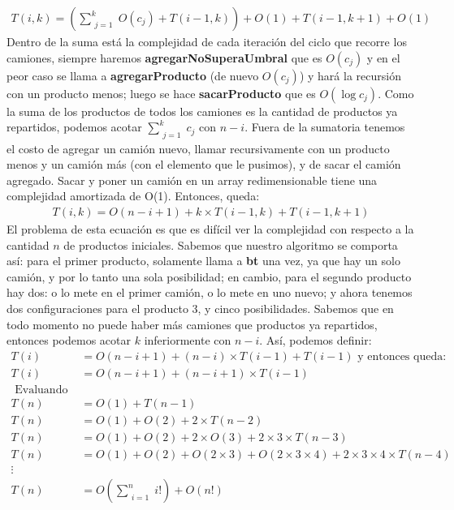 \begin{align*}
T(i,k) = \left(\sum\limits_{\substack{j = 1}}^k O(c_j) + T(i-1,k)\right) + O(1) + T(i-1,k+1) + O(1)
\end{align*}
Dentro de la suma está la complejidad de cada iteración del ciclo que recorre los camiones, siempre haremos \textbf{agregarNoSuperaUmbral} que es $O(c_j)$ y en el peor caso se llama a \textbf{agregarProducto} (de nuevo $O(c_j)$) y hará la recursión con un producto menos; luego se hace \textbf{sacarProducto} que es $O(\log c_j)$. Como la suma de los productos de todos los camiones es la cantidad de productos ya repartidos, podemos acotar $\sum\limits_{\substack{j = 1}}^k c_j$ con $n-i$. Fuera de la sumatoria tenemos el costo de agregar un camión nuevo, llamar recursivamente con un producto menos y un camión más (con el elemento que le pusimos), y de sacar el camión agregado. Sacar y poner un camión en un array redimensionable tiene una complejidad amortizada de O(1). Entonces, queda:
\begin{align*}
T(i,k) = O(n-i+1) + k \times T(i-1,k) + T(i-1,k+1)
\end{align*}
El problema de esta ecuación es que es difícil ver la complejidad con respecto a la cantidad $n$ de productos iniciales. Sabemos que nuestro algoritmo se comporta así: para el primer producto, solamente llama a \textbf{bt} una vez, ya que hay un solo camión, y por lo tanto una sola posibilidad; en cambio, para el segundo producto hay dos: o lo mete en el primer camión, o lo mete en uno nuevo; y ahora tenemos dos configuraciones para el producto 3, y cinco posibilidades. Sabemos que en todo momento no puede haber más camiones que productos ya repartidos, entonces podemos acotar $k$ inferiormente con $n-i$. Así, podemos definir:
\begin{align*}
T(i) &= O(n-i+1) + (n-i) \times T(i-1) + T(i-1) \text{ y entonces queda: } \\
T(i) &= O(n-i+1) + (n-i+1) \times T(i-1) \\
\text{ Evaluando en n: } \\
T(n) &= O(1) + T(n-1) \\
T(n) &= O(1) + O(2) + 2 \times T(n-2) \\
T(n) &= O(1) + O(2) + 2 \times O(3) + 2 \times 3 \times T(n-3) \\
T(n) &= O(1) + O(2) + O(2 \times 3) + O(2 \times 3 \times 4) + 2 \times 3 \times 4 \times T(n-4) \\
\vdots \\
T(n) &= O\left(\sum\limits_{\substack{i = 1}}^n i!\right) + O(n!)
\end{align*}
